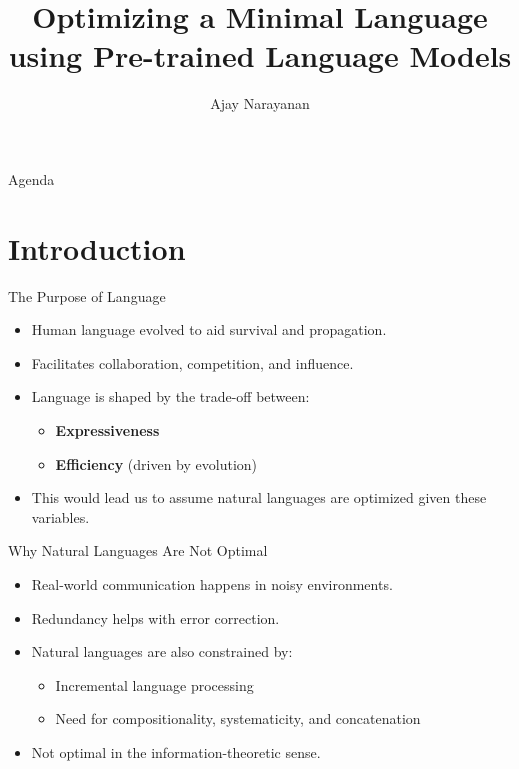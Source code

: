 \documentclass{beamer}
\title{Optimizing a Minimal Language using Pre-trained Language Models}
\date{}
\author{Ajay Narayanan}
\institute{Technical University of Munich}
\begin{document}
  \maketitle

\begin{frame}{Agenda}
	\tableofcontents
\end{frame}

\section{Introduction}

\begin{frame}{The Purpose of Language}
	\begin{itemize}
		\item Human language evolved to aid survival and propagation.
		\item Facilitates collaboration, competition, and influence.
		\item Language is shaped by the trade-off between:
		\begin{itemize}
			\item \textbf{Expressiveness}
			\item \textbf{Efficiency} (driven by evolution)
		\end{itemize}
		\item This would lead us to assume natural languages are optimized given these variables.
	\end{itemize}
\end{frame}

\begin{frame}{Why Natural Languages Are Not Optimal}
	\begin{itemize}
		\item Real-world communication happens in noisy environments.
		\item Redundancy helps with error correction.
		\item Natural languages are also constrained by:
		\begin{itemize}
			\item Incremental language processing
			\item Need for compositionality, systematicity, and concatenation
		\end{itemize}
		\item Not optimal in the information-theoretic sense.
	\end{itemize}
\end{frame}
\end{document}

